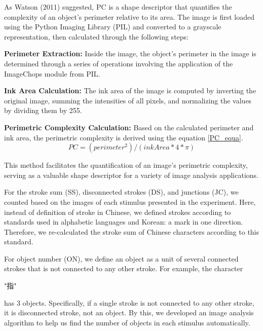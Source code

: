 \documentclass{article}
\begin{document}
As Watson (2011) suggested, PC is a shape descriptor that quantifies the complexity of an object's perimeter relative to its area. The image is first loaded using the Python Imaging Library (PIL) and converted to a grayscale representation, then calculated through the following steps:

\textbf{Perimeter Extraction:} Inside the image, the object's perimeter in the image is determined through a series of operations involving the application of the ImageChops module from PIL. %

\textbf{Ink Area Calculation:} The ink area of the image is computed by inverting the original image, summing the intensities of all pixels, and normalizing the values by dividing them by 255.

\textbf{Perimetric Complexity Calculation:} Based on the calculated perimeter and ink area, the perimetric complexity is derived using the equation \ref{PC_equa}.
\begin{equation}
\label{PC_equa}
    PC = (perimeter ^ 2) / (inkArea * 4 * \pi)
\end{equation}

This method facilitates the quantification of an image's perimetric complexity, serving as a valuable shape descriptor for a variety of image analysis applications.

For the stroke sum (SS), disconnected strokes (DS), and junctions (JC), we counted based on the images of each stimulus presented in the experiment. Here, instead of definition of stroke in Chinese, we defined strokes according to standards used in alphabetic languages and Korean: a mark in one direction. Therefore, we re-calculated the stroke sum of Chinese characters according to this standard.

For object number (ON), we define an object as a unit of several connected strokes that is not connected to any other stroke. For example, the character \begin{CJK*}{UTF8}{gbsn}"指"\end{CJK*} has 3 objects. Specifically, if a single stroke is not connected to any other stroke, it is disconnected stroke, not an object. By this, we developed an image analysis algorithm to help us find the number of objects in each stimulus automatically.
\end{document}
